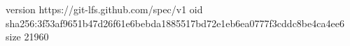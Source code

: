 version https://git-lfs.github.com/spec/v1
oid sha256:3f53af9651b47d26f61e6bebda1885517bd72e1eb6ea0777f3cddc8be4ca4ee6
size 21960
